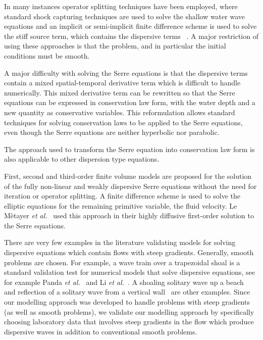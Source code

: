 \documentclass[preprint,sort&compress,1p]{article}
\begin{document}
In many instances operator splitting techniques have been employed, where standard shock capturing techniques are used to solve the shallow water wave equations and an implicit or semi-implicit finite difference scheme is used to solve the stiff source term, which contains the dispersive terms ~\cite{Shiach-Mingham-2009-32,Bonneton-etal-2011-589,Erduran-K-2007-827,Soares-Frazao-Guinot-2008-237,Tonelli-Petti-2009-609,Chazel-etal-2011-105}. A major restriction of using these approaches is that the problem, and in particular the initial conditions must be smooth.

A major difficulty with solving the Serre equations is that the dispersive terms contain a mixed spatial-temporal derivative term which is difficult to handle numerically. This mixed derivative term can be rewritten  so that the Serre equations can be expressed in conservation law form, with the water depth and a new quantity as conservative variables. This reformulation allows standard techniques for solving conservation laws to be applied to the Serre equations, even though the Serre equations are neither hyperbolic nor parabolic.

The approach used to transform the Serre equation into conservation law form is also applicable to other dispersion type equations.

First, second and third-order finite volume models are proposed for the solution of the fully non-linear and weakly dispersive Serre equations without the need for iteration or operator splitting. A finite difference scheme is used to solve the elliptic equations for the remaining primitive variable, the fluid velocity. Le M\`{e}tayer \emph{et al.}~\cite{LeMetayer-etal-2010-2034} used this approach in their highly diffusive first-order solution to the Serre equations.

There are very few examples in the literature validating models for solving dispersive equations which contain flows with steep gradients. Generally, smooth problems are chosen. For example, a wave train over a trapezoidal shoal is a standard validation test for numerical models that solve dispersive equations, see for example Panda \emph{et al.}~\cite{Panda-etal-2014-572} and Li \emph{et al.}~\cite{Li-etal-2014-169}. A shoaling solitary wave up a beach~\cite{Bonneton-etal-2011-1479,Li-etal-2014-169} and reflection of a solitary wave from a vertical wall~\cite{Panda-etal-2014-572,Bonneton-etal-2011-1479} are other examples. Since our modelling approach was developed to handle problems with steep gradients (as well as smooth problems), we validate our modelling approach by specifically choosing laboratory data that involves steep gradients in the flow which produce dispersive waves in addition to conventional smooth problems.
\end{document}
